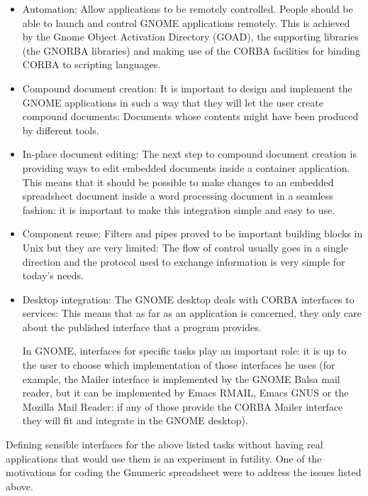 \documentclass[12pt,twoside,twocolumn]{article}
\begin{document}
\begin{itemize}

	\item {Automation:} Allow applications to be remotely
	controlled.  People should be able to launch and control GNOME
	applications remotely.  This is achieved by the Gnome Object
	Activation Directory (GOAD), the supporting libraries (the
	GNORBA libraries) and making use of the CORBA facilities for
	binding CORBA to scripting languages.

	\item {Compound document creation:} It is important to design
	and implement the GNOME applications in such a way that they
	will let the user create compound documents:  Documents whose
	contents might have been produced by different tools. 

	\item {In-place document editing:} The next step to compound
	document creation is providing ways to edit embedded documents
	inside a container application.  This means that it should be
	possible to make changes to an embedded spreadsheet document
	inside a word processing document in a seamless fashion:  it
	is important to make this integration simple and easy to use. 

	\item {Component reuse:} Filters and pipes proved to be 
	important building blocks in Unix but they are very limited:
	The flow of control usually goes in a single direction and the
	protocol used to exchange information is very simple for
	today's needs.  

	\item {Desktop integration:} The GNOME desktop deals with
	CORBA interfaces to services:  This means that as far as an
	application is concerned, they only care about the published
	interface that a program provides.

	In GNOME, interfaces for specific tasks play an important
	role: it is up to the user to choose which implementation of
	those interfaces he uses (for example, the Mailer interface is
	implemented by the GNOME Balsa mail reader, but it can be
	implemented by Emacs RMAIL, Emacs GNUS or the Mozilla Mail
	Reader:  if any of those provide the CORBA Mailer interface
	they will fit and integrate in the GNOME desktop). 

\end{itemize}

Defining sensible interfaces for the above listed tasks without having
real applications that would use them is an experiment in futility.
One of the motivations for coding the Gnumeric spreadsheet were to
address the issues listed above.
\end{document}
